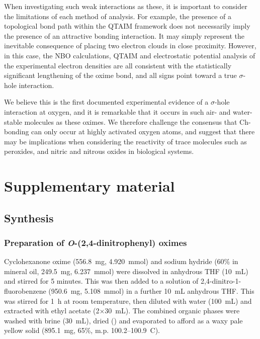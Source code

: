 \begin{refsection}
When investigating such weak interactions as these, it is important to consider the limitations of each method of analysis.
For example, the presence of a topological bond path within the QTAIM framework does not necessarily imply the presence of an attractive bonding interaction.
It may simply represent the inevitable consequence of placing two electron clouds in close proximity.\autocite{Spackman1999,Gatti2005,Bader2009,Cerpa2008,Cerpa2009}
However, in this case, the NBO calculations, QTAIM and electrostatic potential analysis of the experimental electron densities are all consistent with the statistically significant lengthening of the oxime  bond, and all signs point toward a true $\sigma$-hole interaction.

We believe this is the first documented experimental evidence of a $\sigma$-hole interaction at oxygen, and it is remarkable that it occurs in such air- and water-stable molecules as these oximes.
We therefore challenge the consensus that Ch-bonding can only occur at highly activated oxygen atoms, and suggest that there may be implications when considering the reactivity of trace molecules such as peroxides, and nitric and nitrous oxides in biological systems.

\section{Supplementary material}

\subsection{Synthesis}

\subsubsection[Preparation of \refcmpd{cyclohexanone-oxime-dnp,acetone-oxime-dnp}]{Preparation of \emph{O}-(2,4-dinitrophenyl) oximes }
Cyclohexanone oxime (556.8~mg, 4.920~mmol) and sodium hydride (60\% in mineral oil, 249.5~mg, 6.237~mmol) were dissolved in anhydrous THF (10~mL) and stirred for 5 minutes. This was then added to a solution of 2,4-dinitro-1-fluorobenzene (950.6~mg, 5.108~mmol) in a further 10~mL anhydrous THF. This was stirred for 1~h at room temperature, then diluted with water (100~mL) and extracted with ethyl acetate (2$\times$30~mL). The combined organic phases were washed with brine (30~mL), dried () and evaporated to afford  as a waxy pale yellow solid (895.1~mg, 65\%, m.p. 100.2--100.9\degree~C).


\end{refsection}

